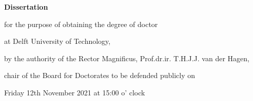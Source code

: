 \begin{titlepage}

\begin{center}

\vspace*{2\bigskipamount}

{\makeatletter
\titlestyle\bfseries\LARGE\@title
\makeatother}

{\makeatletter
\ifx\@subtitle\undefined\else
    \bigskip
    \titlefont\titleshape\Large\@subtitle
\fi
\makeatother}

\end{center}

\cleardoublepage
\thispagestyle{empty}

\begin{center}


\vspace*{2\bigskipamount}

{\makeatletter
\titlestyle\bfseries\LARGE\@title
\makeatother}

{\makeatletter
\ifx\@subtitle\undefined\else
    \bigskip
    \titlefont\titleshape\Large\@subtitle
\fi
\makeatother}

\vfill


{\Large\titlefont\bfseries Dissertation}

\bigskip
\bigskip

for the purpose of obtaining the degree of doctor 

at Delft University of Technology, 

by the authority of the Rector Magnificus, Prof.dr.ir. T.H.J.J. van der Hagen,

chair of the Board for Doctorates to be defended publicly on

Friday 12th November 2021 at 15:00 o' clock



%
%
%


\end{center}
\end{titlepage}
